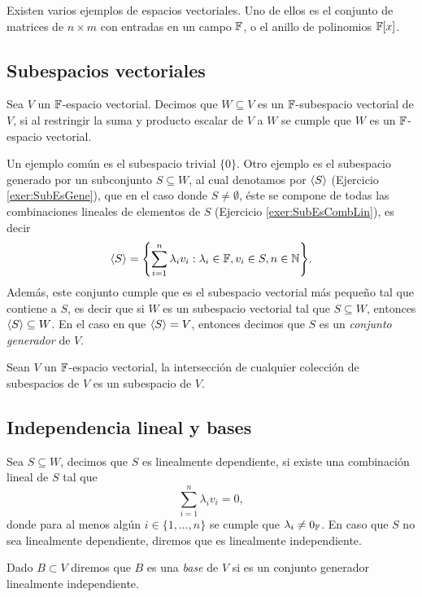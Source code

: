 Existen varios ejemplos de espacios vectoriales. Uno de ellos es el conjunto de matrices de $n \times m $ con entradas en un campo $\mathbb{F}$, o el anillo de polinomios $\mathbb{F}[x]$.

\subsection{Subespacios vectoriales}

\begin{defi}
  Sea $V$ un $\mathbb{F}$-espacio vectorial. Decimos que $W \subseteq V$ es un $\mathbb{F}$-subespacio vectorial de $V$, si al restringir la suma y producto escalar de $V$ a $W$ se cumple que $W$ es un $\mathbb{F}$-espacio vectorial.
\end{defi}

Un ejemplo común es el subespacio trivial $\{0\}$. Otro ejemplo es el subespacio generado por un subconjunto $S \subseteq W$, al cual denotamos por $\langle S\rangle$ (Ejercicio \ref{exer:SubEsGene}), que en el caso donde $S\neq \emptyset$, éste se compone de todas las combinaciones lineales de elementos de $S$ (Ejercicio \ref{exer:SubEsCombLin}), es decir
\[ \inner{S} = \set{ \sum_{i=1}^n \lambda_i v_i : \lambda_i \in \F, v_i \in S, n \in \N }. \]
Además, este conjunto cumple que es el subespacio vectorial más pequeño tal que contiene a $S$, es decir que si $W$ es un subespacio vectorial tal que $S \subseteq W$, entonces $\langle S\rangle \subseteq W$. En el caso en que $\langle S\rangle = V$, entonces decimos que $S$ es un \emph{conjunto generador} de $V$.

\begin{teor}
  Sean $V$ un $\mathbb{F}$-espacio vectorial, la intersección de cualquier colección de subespacios de $V$ es un subespacio de $V$.
\end{teor}

\subsection{Independencia lineal y bases}

\begin{defi}
  Sea $S \subseteq W$, decimos que $S$ es linealmente dependiente, si existe una combinación lineal de $S$ tal que
  \[ \sum_{i=1}^n \lambda_i v_i = 0, \]
  donde para al menos algún $i \in \{1,\ldots,n\}$ se cumple que $\lambda_i \neq 0_{\mathbb{F}}$. En caso que $S$ no sea linealmente dependiente, diremos que es linealmente independiente.

  Dado $B \subset V$ diremos que $B$ es una \emph{base} de $V$ si es un conjunto generador linealmente independiente.
\end{defi}

